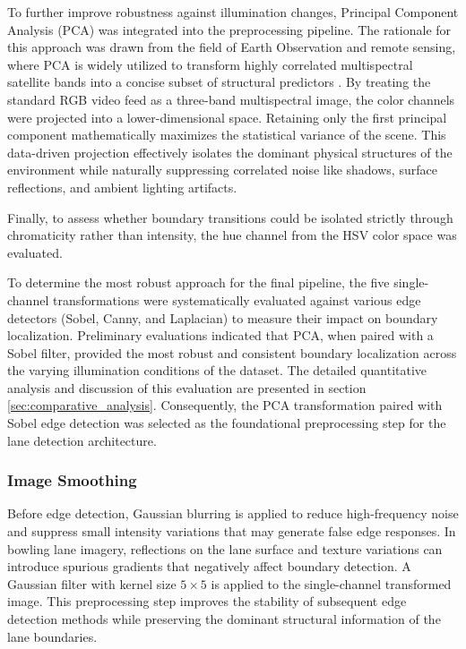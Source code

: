 To further improve robustness against illumination changes, Principal Component Analysis (PCA) \cite{jolliffe2002principal} was integrated into the preprocessing pipeline. The rationale for this approach was drawn from the field of Earth Observation and remote sensing, where PCA is widely utilized to transform highly correlated multispectral satellite bands into a concise subset of structural predictors \cite{richards2012remote}. By treating the standard RGB video feed as a three-band multispectral image, the color channels were projected into a lower-dimensional space. Retaining only the first principal component mathematically maximizes the statistical variance of the scene. This data-driven projection effectively isolates the dominant physical structures of the environment while naturally suppressing correlated noise like shadows, surface reflections, and ambient lighting artifacts.

Finally, to assess whether boundary transitions could be isolated strictly through chromaticity rather than intensity, the hue channel from the HSV color space was evaluated.

To determine the most robust approach for the final pipeline, the five single-channel transformations were systematically evaluated against various edge detectors (Sobel\cite{sobel1973isotropic}, Canny\cite{canny1986computational}, and Laplacian\cite{marr1980edgedetection}) to measure their impact on boundary localization. Preliminary evaluations indicated that PCA, when paired with a Sobel filter, provided the most robust and consistent boundary localization across the varying illumination conditions of the dataset. The detailed quantitative analysis and discussion of this evaluation are presented in section \ref{sec:comparative_analysis}. Consequently, the PCA transformation paired with Sobel edge detection was selected as the foundational preprocessing step for the lane detection architecture.


\subsubsection{Image Smoothing}
Before edge detection, Gaussian blurring is applied to reduce high-frequency noise and suppress small intensity variations that may generate false edge responses. In bowling lane imagery, reflections on the lane surface and texture variations can introduce spurious gradients that negatively affect boundary detection.
A Gaussian filter with kernel size $5\times 5$ is applied to the single-channel transformed image. This preprocessing step improves the stability of subsequent edge detection methods while preserving the dominant structural information of the lane boundaries.



